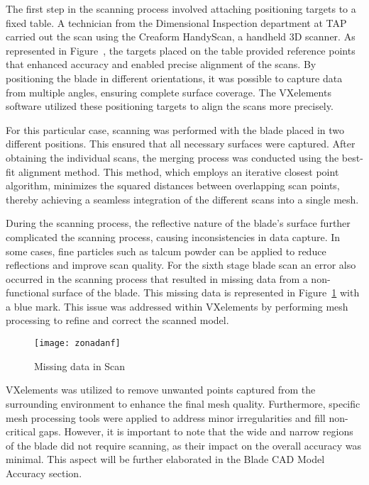 The first step in the scanning process involved attaching positioning targets to a fixed table. A technician from the Dimensional Inspection department at \gls{TAP} carried out the scan using the Creaform HandyScan, a handheld 3D scanner. As represented in Figure~, the targets placed on the table provided reference points that enhanced accuracy and enabled precise alignment of the scans. By positioning the blade in different orientations, it was possible to capture data from multiple angles, ensuring complete surface coverage. The VXelements software utilized these positioning targets to align the scans more precisely.

For this particular case, scanning was performed with the blade placed in two different positions. This ensured that all necessary surfaces were captured. After obtaining the individual scans, the merging process was conducted using the best-fit alignment method. This method, which employs an iterative closest point algorithm, minimizes the squared distances between overlapping scan points, thereby achieving a seamless integration of the different scans into a single mesh.

During the scanning process, the reflective nature of the blade’s surface further complicated the scanning process, causing inconsistencies in data capture. In some cases, fine particles such as talcum powder can be applied to reduce reflections and improve scan quality. For the sixth stage blade scan an error also occurred in the scanning process that resulted in missing data from a non-functional surface of the blade. This missing data is represented in Figure~\ref{fig:zonadanf} with a blue mark. This issue was addressed within VXelements by performing mesh processing to refine and correct the scanned model.

\begin{figure}[H]
    \centering
    \texttt{[image: zonadanf]}
    \caption{Missing data in Scan}
    \label{fig:zonadanf}
\end{figure}

VXelements was utilized to remove unwanted points captured from the surrounding environment to enhance the final mesh quality. Furthermore, specific mesh processing tools were applied to address minor irregularities and fill non-critical gaps. However, it is important to note that the wide and narrow regions of the blade did not require scanning, as their impact on the overall accuracy was minimal. This aspect will be further elaborated in the Blade CAD Model Accuracy section.

